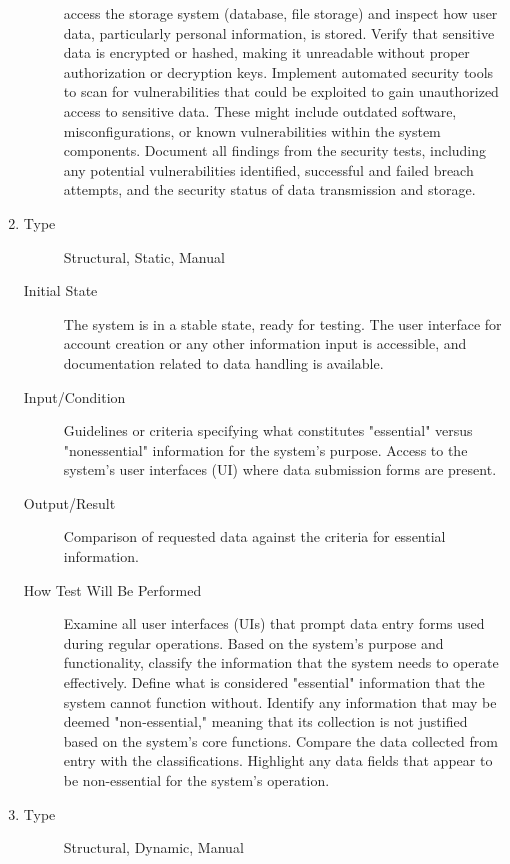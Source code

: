 \documentclass[12pt, titlepage]{article}
\begin{document}
\begin{enumerate}[NFR-T1]
\begin{description}
    access the storage system (database, file storage) and inspect how user
    data, particularly personal information, is stored. Verify that sensitive
    data is encrypted or hashed, making it unreadable without proper
    authorization or decryption keys. Implement automated security tools to scan
    for vulnerabilities that could be exploited to gain unauthorized access to
    sensitive data. These might include outdated software, misconfigurations, or
    known vulnerabilities within the system components. Document all findings
    from the security tests, including any potential vulnerabilities identified,
    successful and failed breach attempts, and the security status of data
    transmission and storage.
  \end{description}
\item \label{NFRT22}
  \begin{description}
  \item[Type] Structural, Static, Manual
  \item[Initial State] The system is in a stable state, ready for testing. The
    user interface for account creation or any other information input is
    accessible, and documentation related to data handling is available.
  \item[Input/Condition] Guidelines or criteria specifying what constitutes
    "essential" versus "nonessential" information for the system’s purpose.
    Access to the system's user interfaces (UI) where data submission forms are
    present.
  \item[Output/Result] Comparison of requested data against the criteria for
    essential information.
  \item[How Test Will Be Performed] Examine all user interfaces (UIs) that
    prompt data entry forms used during regular operations. Based on the
    system’s purpose and functionality, classify the information that the system
    needs to operate effectively. Define what is considered "essential"
    information that the system cannot function without. Identify any
    information that may be deemed "non-essential," meaning that its collection
    is not justified based on the system’s core functions. Compare the data
    collected from entry with the classifications. Highlight any data fields
    that appear to be non-essential for the system’s operation.
  \end{description}
\item \label{NFRT23}
  \begin{description}
  \item[Type] Structural, Dynamic, Manual

\end{description}
\end{enumerate}
\end{document}
